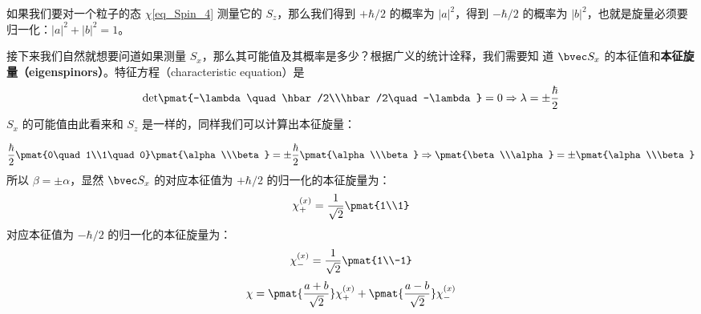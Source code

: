 如果我们要对一个粒子的态 $\chi$\autoref{eq_Spin_4} 测量它的 $S_z$，那么我们得到 $+\hbar/2$ 的概率为 $|a|^2$，得到 $-\hbar/2$ 的概率为 $|b|^2$，也就是旋量必须要归一化：$|a|^2+ |b|^2 = 1$。

接下来我们自然就想要问道如果测量 $S_x$，那么其可能值及其概率是多少？根据广义的统计诠释，我们需要知
道 $\bvec S_x$ 的本征值和\textbf{本征旋量（eigenspinors）}。特征方程（characteristic equation）是
\begin{equation}
\rm{det}\pmat{-\lambda \quad \hbar/2\\\hbar/2\quad -\lambda}=0\Rightarrow\lambda=\pm\frac{\hbar}{2}
\end{equation}
$S_x$ 的可能值由此看来和 $S_z$ 是一样的，同样我们可以计算出本征旋量：

\begin{equation}
\frac{\hbar}{2}\pmat{0\quad 1\\1\quad0}\pmat{\alpha\\\beta}=\pm\frac{\hbar}{2}\pmat{\alpha\\\beta} \Rightarrow \pmat{\beta\\\alpha}=\pm\pmat{\alpha\\\beta}
\end{equation}
所以 $\beta=\pm\alpha$，显然 $\bvec S_x$ 的对应本征值为 $+\hbar/2$ 的归一化的本征旋量为：
\begin{equation}\label{eq_Spin_5}
\chi_+^{(x)}=\frac{1}{\sqrt{2}}\pmat{1\\1}
\end{equation}
对应本征值为 $-\hbar/2$ 的归一化的本征旋量为：
\begin{equation}\label{eq_Spin_6}
\chi_-^{(x)}=\frac{1}{\sqrt{2}}\pmat{1\\-1}
\end{equation}
\begin{equation}
\chi = \pmat{\frac{a+b}{\sqrt{2}}}\chi_+^{(x)}+\pmat{\frac{a-b}{\sqrt{2}}}\chi_-^{(x)}
\end{equation}
